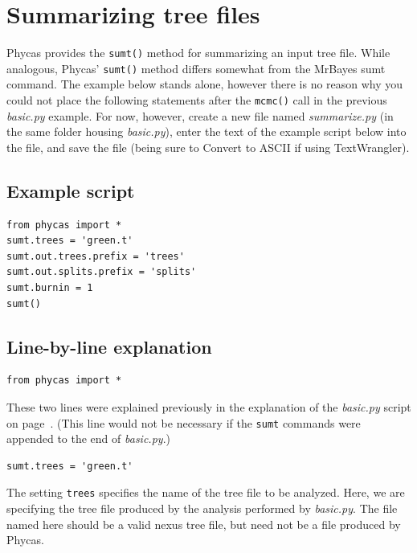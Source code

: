 \documentclass[10pt]{article}
\newcommand{\pathname}[1]{{\em #1}}			%
\newcommand{\menu}[1]{{\sf #1}}				%
\newcommand{\code}[1]{{\tt #1}}				%
\newcommand{\opt}[1]{{\tt \small #1}\index{#1}}		%
\begin{document}
\section{Summarizing tree files}

Phycas provides the {\tt sumt()} method for summarizing an input tree file. While analogous, Phycas' {\tt sumt()} method differs somewhat from the MrBayes sumt command. The example below stands alone, however there is no reason why you could not place the following statements after the {\tt mcmc()} call in the previous \pathname{basic.py} example. For now, however, create a new file named \pathname{summarize.py} (in the same folder housing \pathname{basic.py}), enter the text of the example script below into the file, and save the file (being sure to \menu{Convert to ASCII} if using TextWrangler).

\subsection{Example script}
\begin{verbatim}
from phycas import *
sumt.trees = 'green.t'
sumt.out.trees.prefix = 'trees'
sumt.out.splits.prefix = 'splits'
sumt.burnin = 1
sumt()
\end{verbatim}

\subsection{Line-by-line explanation}
\begin{samepage}
\begin{verbatim}
from phycas import *
\end{verbatim}
These two lines were explained previously in the explanation of the \pathname{basic.py} script on page~\pageref{subsec:basicpyexplanation}. (This line would not be necessary if the \code{sumt} commands were appended to the end of \pathname{basic.py}.)
\end{samepage}

\begin{samepage}
\begin{verbatim}
sumt.trees = 'green.t'
\end{verbatim}
The setting \opt{trees} specifies the name of the tree file to be analyzed. Here, we are specifying the tree file produced by the analysis performed by \pathname{basic.py}. The file named here should be a valid nexus tree file, but need not be a file produced by Phycas.
\end{samepage}
\end{document}
